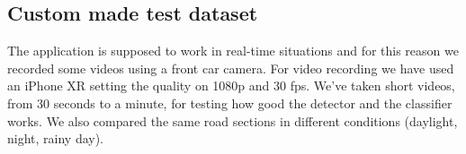 \subsection{Custom made test dataset}
The application is supposed to work in real-time situations and for this reason we recorded some videos using a front car camera. For video recording we have used an iPhone XR setting the quality on 1080p and 30 fps. We've taken short videos, from 30 seconds to a minute, for testing how good the detector and the classifier works. We also compared the same road sections in different conditions (daylight, night, rainy day). 